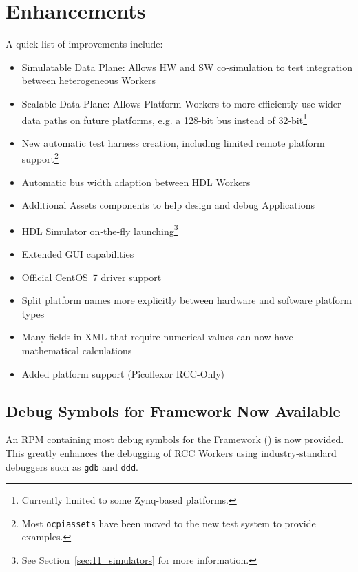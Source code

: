 \newpage
{}
\section{Enhancements}
A quick list of improvements include:
\begin{itemize}
\setlength\itemsep{0em} %
\item Simulatable Data Plane: Allows HW and SW co-simulation to test
integration between heterogeneous Workers
\item Scalable Data Plane: Allows Platform Workers to more efficiently use wider data paths on future platforms, e.g. a 128-bit bus instead of 32-bit\footnote{Currently limited to some Zynq-based platforms.}
\item New automatic test harness creation, including limited remote platform support\footnote{Most \texttt{ocpiassets} have been moved to the new test system to provide examples.}
\item Automatic bus width adaption between HDL Workers
\item Additional Assets components to help design and debug Applications
\item HDL Simulator on-the-fly launching\footnote{See Section~\ref{sec:11_simulators} for more information.}
\item Extended GUI capabilities
\item Official CentOS~7 driver support
\item Split platform names more explicitly between hardware and software platform types
\item Many fields in XML that require numerical values can now have mathematical calculations %
\item Added platform support (Picoflexor RCC-Only)
\end{itemize}

\subsection{Debug Symbols for Framework Now Available}
An RPM containing most debug symbols for the Framework () is now provided. This greatly enhances the debugging of RCC Workers using industry-standard debuggers such as \texttt{gdb} and \texttt{ddd}.

